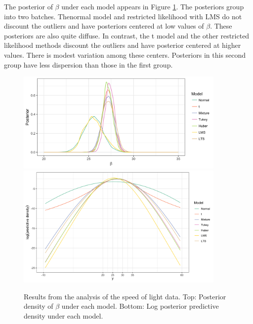 \documentclass[ba]{imsart}
\begin{document}
The posterior of $\beta$ under each model appears in Figure \ref{fig:newcomb_post}.  The posteriors group into two batches.  Thenormal model and restricted likelihood with LMS do not discount the outliers and have posteriors centered at low values of $\beta$.  These posteriors are also quite diffuse.  In contrast, the t model and the other restricted likelihood methods discount the outliers and have posterior centered at higher values.  There is modest variation among these centers.  Posteriors in this second group have less dispersion than those in the first group.   
\begin{figure}[t]
\centering
{\includegraphics[width = 4in]{figs/speed_of_light_beta.png}}
{\includegraphics[width = 4in]{figs/speed_of_light_predictive.png}}
\caption{Results from the analysis of the speed of light data. Top: Posterior density of $\beta$ under each model. Bottom: Log posterior predictive density under each model.}
\label{fig:newcomb_post}
\end{figure}
\end{document}

